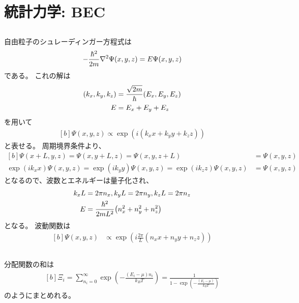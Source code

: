 \documentclass[../../sp_2021.tex]{subfiles}
\begin{document}
\setcounter{section}{1}
\section{統計力学: BEC}
\subsection{}
自由粒子のシュレーディンガー方程式は
\begin{equation}\begin{aligned}[b]
    -\frac{\hbar^2}{2m}\laplacian \Psi(x,y,z) = E\Psi(x,y,z)
\end{aligned}\end{equation}
である。
これの解は
\begin{equation}\begin{aligned}[b]
    (k_x,k_y,k_z)&=\frac{\sqrt{2m}}{\hbar}\qty(E_x,E_y,E_z)\\
    E &= E_x+E_y+E_z
\end{aligned}\end{equation}
を用いて
\begin{equation}\begin{aligned}[b]
    \Psi(x,y,z)\propto \exp(i(k_xx+k_yy+k_zz))
\end{aligned}\end{equation}
と表せる。
周期境界条件より、
\begin{equation}\begin{aligned}[b]
    \Psi(x+L,y,z)=\Psi(x,y+L,z)=\Psi(x,y,z+L)&=\Psi(x,y,z)\\
    \exp(ik_xx)\Psi(x,y,z)=\exp(ik_yy)\Psi(x,y,z)=\exp(ik_zz)\Psi(x,y,z)&=\Psi(x,y,z)
\end{aligned}\end{equation}
となるので、波数とエネルギーは量子化され、
\begin{equation}\begin{aligned}[b]
    k_xL &= 2\pi n_x,
    k_yL = 2\pi n_y,
    k_zL = 2\pi n_z\\
    E &= \frac{\hbar^2}{2mL^2}\qty(n_x^2+n_y^2+n_z^2)
\end{aligned}\end{equation}
となる。
波動関数は
\begin{equation}\begin{aligned}[b]
    \Psi(x,y,z) &\propto \exp(i\frac{2\pi}{L}(n_xx+n_yy+n_zz))
\end{aligned}\end{equation}

\subsection{}
分配関数の和は
\begin{equation}\begin{aligned}[b]
    \Xi_i = \sum_{n_i=0}^{\infty}\exp(-\frac{(E_i-\mu)n_i}{k_BT}) = \frac{1}{1-\exp(-\frac{(E_i-\mu)}{k_BT})}
\end{aligned}\end{equation}
のようにまとめれる。
\end{document}
